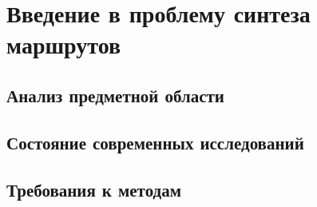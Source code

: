 \chapter{Введение в проблему синтеза маршрутов}
\section{Анализ предметной области}
\section{Состояние современных исследований}
\section{Требования к методам}